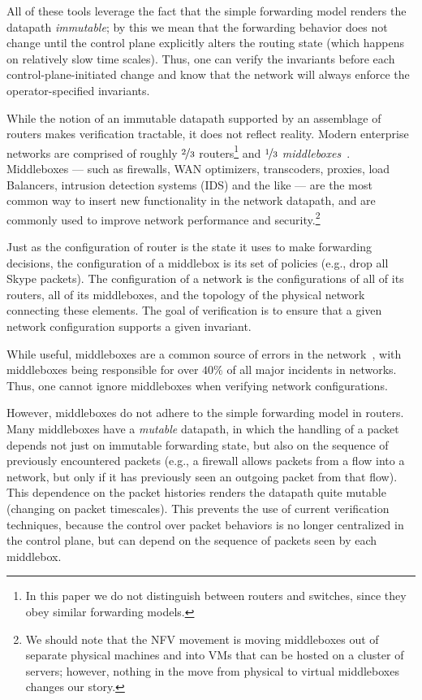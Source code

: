 All of these tools leverage the fact that the simple forwarding model renders the datapath {\em immutable}; by this we mean that the forwarding behavior does not change until the control plane explicitly alters the routing state (which happens on relatively slow time scales). Thus, one can verify the invariants before each control-plane-initiated change and know that the network will always enforce the operator-specified invariants.

While the notion of an immutable datapath supported by an assemblage of routers makes verification tractable, it does not reflect reality. Modern enterprise networks are comprised of roughly $\nicefrac{2}{3}$ routers\footnote{In this paper we do not distinguish between routers and switches, since they obey similar forwarding models.} and $\nicefrac{1}{3}$ {\em middleboxes}~\cite{sherry2012making}.  Middleboxes --- such as firewalls, WAN optimizers, transcoders, proxies, load Balancers, intrusion detection systems (IDS) and the like --- are the most common way to insert new functionality in the network datapath, and are commonly used to improve network performance and security.\footnote{We should note that the NFV movement is moving middleboxes out of separate physical machines and into VMs that can be hosted on a cluster of servers; however, nothing in the move from physical to virtual middleboxes changes our story.} 

Just as the configuration of router is the state it uses to make forwarding decisions, the configuration of a middlebox is its set of policies (e.g., drop all Skype packets). The configuration of a network is the configurations of all of its routers, all of its middleboxes, and the topology of the physical network connecting these elements. The goal of verification is to ensure that a given network configuration supports a given invariant.

While useful, middleboxes are a common source of errors in the network~\cite{potharaju2013demystifying}, with middleboxes 
being responsible for over $40\%$ of all major
incidents in networks. Thus, one cannot ignore middleboxes when verifying network configurations.

However, middleboxes do not adhere to the simple forwarding model in routers. Many middleboxes have a {\em mutable} datapath, in which the handling of a packet depends not just on immutable forwarding state, but also on the sequence of previously encountered packets (e.g., a firewall allows packets from a flow into a network, but only if it has previously seen an outgoing packet from that flow).  This dependence on the packet histories renders the datapath quite mutable (changing on packet timescales). This prevents the use of current verification techniques, because the control over packet behaviors is no longer centralized in the control plane, but can depend on the sequence of packets seen by each middlebox.


